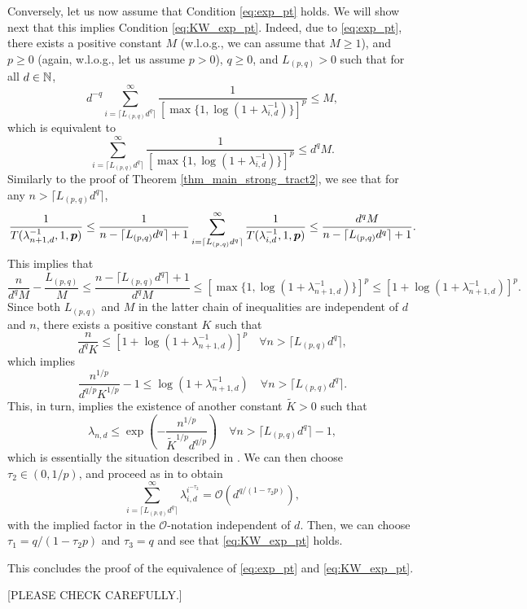 \documentclass[sort&compress]{elsarticle}
\begin{document}
{Conversely, let us now assume that Condition \eqref{eq:exp_pt} holds. We will show next that this implies Condition \eqref{eq:KW_exp_pt}. Indeed, due to \eqref{eq:exp_pt}, there exists a positive constant $M$ (w.l.o.g., we can assume that $M\ge 1$), and $p\ge 0$ (again, w.l.o.g., let us assume $p>0$), $q\ge 0$, and $L_{(p,q)}>0$ such that for all $d\in\mathbb{N}$,
\[
d^{-q} 
\sum_{i=\lceil L_{(p,q)} d^{q}\rceil}^\infty \frac{1}{[\max\{1,\log(1+\lambda_{i,d}^{-1})\}]^p} \le M,
\]
which is equivalent to 
\[
\sum_{i=\lceil L_{(p,q)} d^{q}\rceil}^\infty \frac{1}{[\max\{1,\log(1+\lambda_{i,d}^{-1})\}]^p} \le d^q M. 
\]
Similarly to the proof of Theorem \ref{thm_main_strong_tract2}, we see that for any $n > \lceil L_{(p,q)} d^{q}\rceil $, 
\[
\frac{1}{T(\lambda_{n+1,d}^{-1},1,\boldsymbol{p})} \le \frac{1}{n-\lceil L_{(p,q)} d^{q}\rceil +1 }
\sum_{i=\lceil L_{(p,q)} d^{q}\rceil}^\infty  \frac{1}{T(\lambda_{i,d}^{-1},1,\boldsymbol{p})}
\le \frac{d^q M}{n-\lceil L_{(p,q)} d^{q}\rceil +1 }.
\]
This implies that
\[
\frac{n}{d^q M}-\frac{L_{(p,q)}}{M}\le\frac{n-\lceil L_{(p,q)} d^{q}\rceil +1 }{d^q M} \le [\max\{1,\log(1+\lambda_{n+1,d}^{-1})\}]^p 
\le [1 + \log(1+\lambda_{n+1,d}^{-1})]^p.
\]
Since both $L_{(p,q)}$ and $M$ in the latter chain of inequalities are independent of $d$ and $n$, there 
exists a positive constant $K$ such that 
\[
\frac{n}{d^q K} \le [1 + \log(1+\lambda_{n+1,d}^{-1})]^p\quad \forall n > \lceil L_{(p,q)} d^{q}\rceil,
\]
which implies 
\[
\frac{n^{1/p}}{d^{q/p} K^{1/p}} -1 \le \log(1+\lambda_{n+1,d}^{-1})\quad \forall n > \lceil L_{(p,q)} d^{q}\rceil.
\]
This, in turn, implies the existence of another constant $\widetilde{K}>0$ such that 
\[
\lambda_{n,d} \le \exp\left(-\frac{n^{1/p}}{\widetilde{K}^{1/p} d^{q/p}}\right)
\quad \forall n > \lceil L_{(p,q)} d^{q}\rceil-1,
\]
which is essentially the situation described in \cite[p.~118]{KriWoz19a}. We can then choose $\tau_2\in (0,1/p)$, 
and proceed as in \cite{KriWoz19a} to obtain 
\[
\sum_{i=\lceil L_{(p,q)} d^{q}\rceil}^\infty \lambda_{i,d}^{i^{-\tau_2}}=\mathcal{O}(d^{q/(1-\tau_2 p)}),
\]
with the implied factor in the $\mathcal{O}$-notation independent of $d$. Then, we can choose $\tau_1=q/(1-\tau_2 p)$ and $\tau_3=q$ and see that \eqref{eq:KW_exp_pt} holds.

This concludes the proof of the equivalence of \eqref{eq:exp_pt} and \eqref{eq:KW_exp_pt}.

\bigskip

[PLEASE CHECK CAREFULLY.]}
\end{document}
